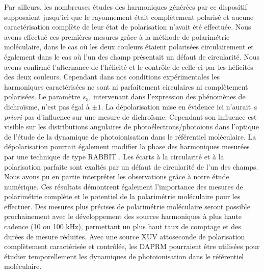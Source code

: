 Par ailleurs, les nombreuses études des harmoniques générées par ce dispositif supposaient jusqu'ici que le rayonnement était complètement polarisé et aucune caractérisation complète de leur état de polarisation n'avait été effectuée. Nous avons effectué ces premières mesures grâce à la méthode de polarimétrie moléculaire, dans le cas où les deux couleurs étaient polarisées circulairement et également dans le cas où l'un des champ présentait un défaut de circularité. Nous avons confirmé l'alternance de l'hélicité et le contrôle de celle-ci par les hélicités des deux couleurs. Cependant dans nos conditions expérimentales les harmoniques caractérisées ne sont ni parfaitement circulaires ni complètement polarisées. Le paramètre $s_3$, intervenant dans l'expression des phénomènes de dichroïsme, n'est pas égal à $\pm 1$. La dépolarisation mise en évidence ici n'aurait \textit{a priori} pas d'influence sur une mesure de dichroïsme. Cependant son influence est visible sur les distributions angulaires de photoélectrons/photoions dans l'optique de l'étude de la dynamique de photoionisation dans le référentiel moléculaire. La dépolarisation pourrait également modifier la phase des harmoniques mesurées par une technique de type RABBIT . Les écarts  à la circularité et à la polarisation parfaite sont exaltés par un défaut de circularité de l'un des champs. Nous avons pu en partie interpréter les observations grâce à notre étude numérique. Ces résultats démontrent également l'importance des mesures de polarimétrie complète et le potentiel de la polarimétrie moléculaire pour les effectuer. Des mesures plus précises de polarimétrie moléculaire seront possible prochainement avec le développement des sources harmoniques à plus haute cadence (10 ou 100 kHz), permettant un plus haut taux de comptage et des durées de mesure réduites. Avec une source XUV attoseconde de polarisation complètement caractérisée et contrôlée, les DAPRM pourraient être utilisées pour étudier temporellement les dynamiques de photoionisation dans le référentiel moléculaire.


